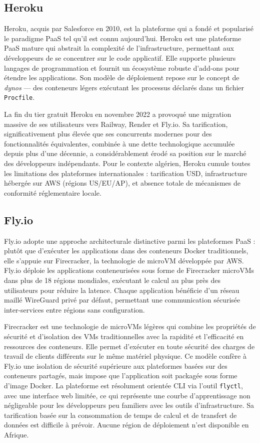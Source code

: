 \subsection*{Heroku}

Heroku, acquis par Salesforce en 2010, est la plateforme qui a fondé et popularisé le paradigme PaaS tel qu'il est connu aujourd'hui. Heroku est une plateforme PaaS mature qui abstrait la complexité de l'infrastructure, permettant aux développeurs de se concentrer sur le code applicatif. Elle supporte plusieurs langages de programmation et fournit un écosystème robuste d'add-ons pour étendre les applications.  Son modèle de déploiement repose sur le concept de \textit{dynos} — des conteneurs légers exécutant les processus déclarés dans un fichier \texttt{Procfile}.

La fin du tier gratuit Heroku en novembre 2022 a provoqué une migration massive de ses utilisateurs vers Railway, Render et Fly.io. Sa tarification, significativement plus élevée que ses concurrents modernes pour des fonctionnalités équivalentes, combinée à une dette technologique accumulée depuis plus d'une décennie, a considérablement érodé sa position sur le marché des développeurs indépendants. Pour le contexte algérien, Heroku cumule toutes les limitations des plateformes internationales : tarification USD, infrastructure hébergée sur AWS (régions US/EU/AP), et absence totale de mécanismes de conformité réglementaire locale.

\subsection*{Fly.io}

Fly.io adopte une approche architecturale distinctive parmi les plateformes PaaS : plutôt que d'exécuter les applications dans des conteneurs Docker traditionnels, elle s'appuie sur Firecracker, la technologie de microVM développée par AWS. Fly.io déploie les applications conteneurisées sous forme de Firecracker microVMs dans plus de 18 régions mondiales, exécutant le calcul au plus près des utilisateurs pour réduire la latence. Chaque application bénéficie d'un réseau maillé WireGuard privé par défaut, permettant une communication sécurisée inter-services entre régions sans configuration. 

Firecracker est une technologie de microVMs légères qui combine les propriétés de sécurité et d'isolation des VMs traditionnelles avec la rapidité et l'efficacité en ressources des conteneurs. Elle permet d'exécuter en toute sécurité des charges de travail de clients différents sur le même matériel physique.  Ce modèle confère à Fly.io une isolation de sécurité supérieure aux plateformes basées sur des conteneurs partagés, mais impose que l'application soit packagée sous forme d'image Docker. La plateforme est résolument orientée CLI via l'outil \texttt{flyctl}, avec une interface web limitée, ce qui représente une courbe d'apprentissage non négligeable pour les développeurs peu familiers avec les outils d'infrastructure. Sa tarification basée sur la consommation de temps de calcul et de transfert de données est difficile à prévoir. Aucune région de déploiement n'est disponible en Afrique.


